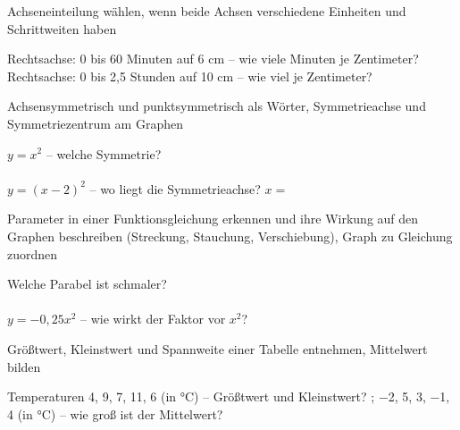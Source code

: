 \begin{aufgabe}{Achseneinteilung wählen, wenn beide Achsen verschiedene Einheiten und Schrittweiten haben}
\begin{teile}
\teil Rechtsachse: 0 bis 60 Minuten auf 6 cm – wie viele Minuten je Zentimeter? \leerfeld[min]
\teil Rechtsachse: 0 bis 2,5 Stunden auf 10 cm – wie viel je Zentimeter? \leerfeld[h]
\end{teile}
\end{aufgabe}

\begin{aufgabe}{Achsensymmetrisch und punktsymmetrisch als Wörter, Symmetrieachse und Symmetriezentrum am Graphen}
\begin{teile}
\teil $y = x^2$ – welche Symmetrie?\\ \\ 
\teil $y = (x - 2)^2$ – wo liegt die Symmetrieachse? $x = $ \leerfeld
\end{teile}
\end{aufgabe}

\begin{aufgabe}{Parameter in einer Funktionsgleichung erkennen und ihre Wirkung auf den Graphen beschreiben (Streckung, Stauchung, Verschiebung), Graph zu Gleichung zuordnen}
\begin{teile}
\teil Welche Parabel ist schmaler?\\ \\ 
\teil $y = -0{,}25x^2$ – wie wirkt der Faktor vor $x^2$? \leerfeld
\end{teile}
\end{aufgabe}

\begin{aufgabe}{Größtwert, Kleinstwert und Spannweite einer Tabelle entnehmen, Mittelwert bilden}
\begin{teile}
\teil Temperaturen 4, 9, 7, 11, 6 (in °C) – Größtwert und Kleinstwert? \leerfeld; \leerfeld
\teil −2, 5, 3, −1, 4 (in °C) – wie groß ist der Mittelwert? \leerfeld[°C]
\end{teile}
\end{aufgabe}

